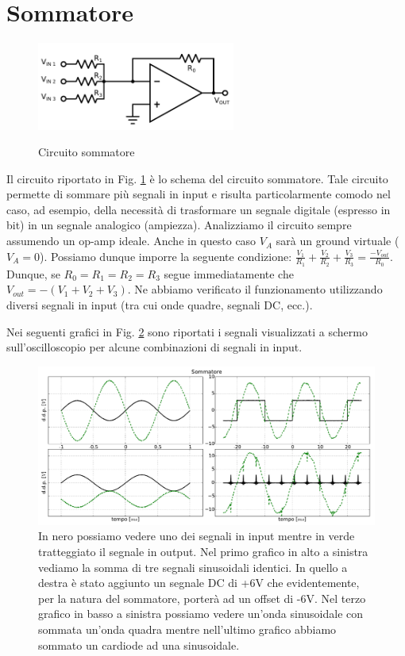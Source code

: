 \section{Sommatore}

\begin{figure}
	\caption{Circuito sommatore}
	\includegraphics[width=65mm]{ccsum.pdf}
	\label{fig:ccsum}
\end{figure}

Il circuito riportato in Fig. \ref{fig:ccsum} è lo schema del circuito sommatore.
Tale circuito permette di sommare più segnali in input e risulta particolarmente comodo nel caso, ad esempio, della necessità di trasformare un segnale digitale (espresso in bit) in un segnale analogico (ampiezza).
Analizziamo il circuito sempre assumendo un op-amp ideale.
Anche in questo caso $V_A$ sarà un ground virtuale ($V_A = 0$).
Possiamo dunque imporre la seguente condizione: $\frac{V_1}{R_1}+\frac{V_2}{R_2}+\frac{V_3}{R_3}=\frac{-V_{out}}{R_0}$.
Dunque, se $R_0=R_1=R_2=R_3$ segue immediatamente che $V_{out}=-(V_1+V_2+V_3)$.
Ne abbiamo verificato il funzionamento utilizzando diversi segnali in input (tra cui onde quadre, segnali DC, ecc.).

Nei seguenti grafici in Fig. \ref{fig:sum} sono riportati i segnali visualizzati a schermo sull'oscilloscopio per alcune combinazioni di segnali in input.

\begin{figure}[h]
	\centering
			\includegraphics[width=.9\textwidth]{sum_serie_05.pdf}
			\caption{In nero possiamo vedere uno dei segnali in input mentre in verde tratteggiato il segnale in output. Nel primo grafico in alto a sinistra vediamo la somma di tre segnali sinusoidali identici. In quello a destra è stato aggiunto un segnale DC di +6V che evidentemente, per la natura del sommatore, porterà ad un offset di -6V. Nel terzo grafico in basso a sinistra possiamo vedere un'onda sinusoidale con sommata un'onda quadra mentre nell'ultimo grafico abbiamo sommato un cardiode ad una sinusoidale.}
			\label{fig:sum}
\end{figure}

